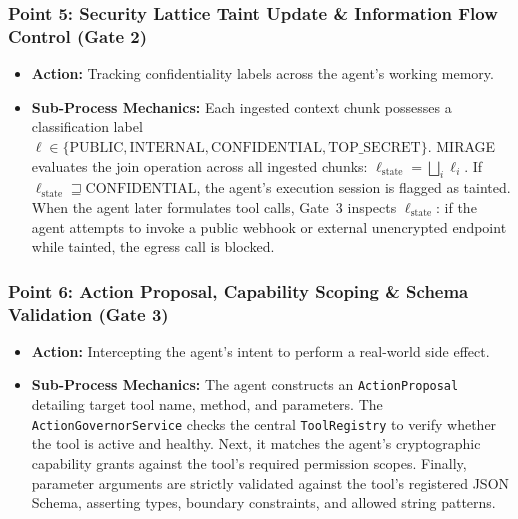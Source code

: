 \documentclass[11pt,a4paper]{article}
\begin{document}
\subsubsection*{Point 5: Security Lattice Taint Update \& Information Flow Control (Gate 2)}
\begin{itemize}[leftmargin=*,itemsep=1pt]
  \item \textbf{Action:} Tracking confidentiality labels across the agent's working memory.
  \item \textbf{Sub-Process Mechanics:} Each ingested context chunk possesses a classification label $\ell \in \{\text{PUBLIC}, \text{INTERNAL}, \text{CONFIDENTIAL}, \text{TOP\_SECRET}\}$. MIRAGE evaluates the join operation across all ingested chunks: $\ell_{\text{state}} = \bigsqcup_{i} \ell_i$. If $\ell_{\text{state}} \sqsupseteq \text{CONFIDENTIAL}$, the agent's execution session is flagged as tainted. When the agent later formulates tool calls, Gate~3 inspects $\ell_{\text{state}}$: if the agent attempts to invoke a public webhook or external unencrypted endpoint while tainted, the egress call is blocked.
\end{itemize}

\subsubsection*{Point 6: Action Proposal, Capability Scoping \& Schema Validation (Gate 3)}
\begin{itemize}[leftmargin=*,itemsep=1pt]
  \item \textbf{Action:} Intercepting the agent's intent to perform a real-world side effect.
  \item \textbf{Sub-Process Mechanics:} The agent constructs an \texttt{ActionProposal} detailing target tool name, method, and parameters. The \texttt{ActionGovernorService} checks the central \texttt{ToolRegistry} to verify whether the tool is active and healthy. Next, it matches the agent's cryptographic capability grants against the tool's required permission scopes. Finally, parameter arguments are strictly validated against the tool's registered JSON Schema, asserting types, boundary constraints, and allowed string patterns.
\end{itemize}
\end{document}
